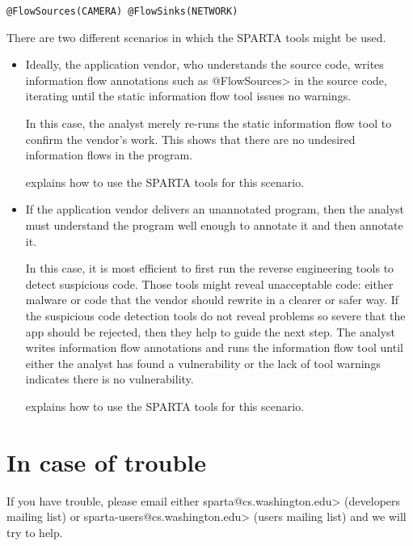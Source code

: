 \begin{Verbatim}
@FlowSources(CAMERA) @FlowSinks(NETWORK)
\end{Verbatim}



There are two different scenarios in which the SPARTA tools might be used.

\begin{itemize}
\item
  Ideally, the application vendor, who understands the source code,
  writes information flow annotations such as \<@FlowSources> in the source
  code, iterating until the static information flow tool issues no warnings.

  In this case, the analyst merely re-runs the static information flow tool
  to confirm the vendor's work.  This shows that there are no undesired
  information flows in the program.

   explains how to use the SPARTA tools for
  this scenario.

\item
  If the application vendor delivers an unannotated program, then the
  analyst must understand the program well enough to annotate it and then
  annotate it.

  In this case, it is most efficient to first run the reverse engineering
  tools to detect suspicious code.  Those tools might reveal unacceptable
  code: either malware or code that the vendor
  should rewrite in a clearer or safer way.  If the suspicious code
  detection tools do not reveal problems so severe that the app should be
  rejected, then they help to guide the next step.   The analyst writes
  information flow annotations and runs the information
  flow tool until either the analyst has found a vulnerability or the lack
  of tool warnings indicates there is no vulnerability.

   explains how to use the SPARTA tools for
  this scenario.
\end{itemize}


\section{In case of trouble\label{sec:incaseoftrouble}}

\begin{sloppypar}
If you have trouble, please email either
\<sparta@cs.washington.edu>
(developers mailing list) or
\<sparta-users@cs.washington.edu> (users
mailing list) and we will try to help.
\end{sloppypar}





